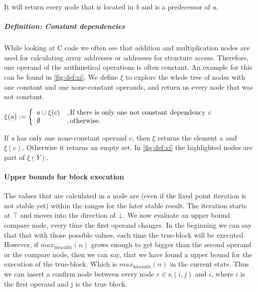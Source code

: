 It will return every node that is located in \textit{b} and is a predecessor of \textit{a}.

\subparagraph{Definition: Constant dependencies}

While looking at C code we often see that addition and multiplication nodes are used for calculating array addresses or addresses for structure access. Therefore, one operand of the arithmetical operations is often constant. An example for this can be found in \autoref{fig:def:xi}.
We define $\xi$ to explore the whole tree of nodes with one constant and one none-constant operands, and return us every node that was not constant.
\begin{center}
$\xi(a) := 
\left\{
	\begin{array}{l}
		a \cup \xi(c)\\ 
		\emptyset
	\end{array}
	\begin{array}{l}
		, \text{If there is only one not constant dependency \textit{c}} \\ 
		, \text{otherwise}.
	\end{array}
\right.$
\end{center}

If \textit{a} has only one none-constant operand c, then $\xi$ returns the element $a$ and $\xi(c)$. Otherwise it returns an empty set. In \autoref{fig:def:xi} the highlighted nodes are part of $\xi(Y)$.

\paragraph{Upper bounds for block execution}
The values that are calculated in a node are (even if the fixed point iteration is not stable yet) within the ranges for the later stable result. The iteration starts at $\top$ and moves into the direction of $\bot$. 
We now evaluate an upper bound compare node, every time the first operand changes. In the beginning we can say that that with those possible values, each time the true-block will be executed. However, if $max_{bitwidth}(n)$ grows enough to get bigger than the second operand or the compare node, then we can say, that we have found a upper bound for the execution of the true-block. Which is $max _{bitwidth}(n)$ in the current state. Thus we can insert a confirm node between every node $e \in \kappa(i, j)$ and $i$, where $i$ is the first operand and j is the true block.

